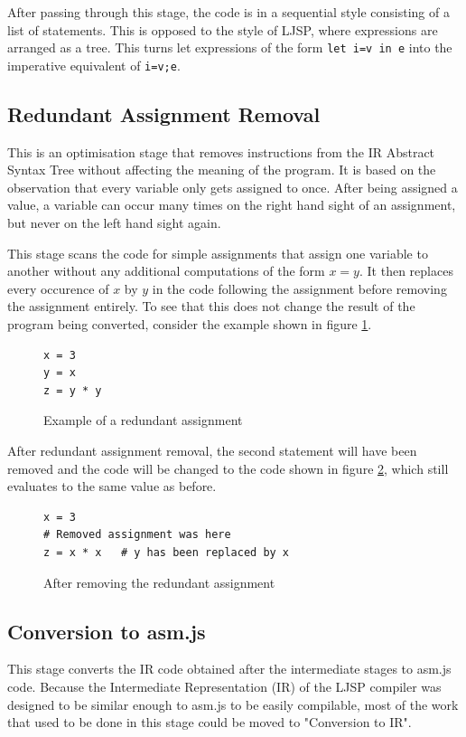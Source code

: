 \documentclass[11pt]{report}
\begin{document}
After passing through this stage, the code is in a sequential style consisting of a list of statements. This is opposed to the style of LJSP, where expressions are arranged as a tree. This turns let expressions of the form \texttt{let i=v in e} into the imperative equivalent of \texttt{i=v;e}.


\subsection{Redundant Assignment Removal}
This is an optimisation stage that removes instructions from the IR Abstract Syntax Tree without affecting the meaning of the program. It is based on the observation that every variable only gets assigned to once. After being assigned a value, a variable can occur many times on the right hand sight of an assignment, but never on the left hand sight again.

This stage scans the code for simple assignments that assign one variable to another without any additional computations of the form $x = y$. It then replaces every occurence of $x$ by $y$ in the code following the assignment before removing the assignment entirely. To see that this does not change the result of the program being converted, consider the example shown in figure \ref{redrem1}.
\begin{figure}[ht]
\begin{lstlisting}
x = 3
y = x
z = y * y
\end{lstlisting}
\caption{Example of a redundant assignment}
\label{redrem1}
\end{figure}

After redundant assignment removal, the second statement will have been removed and the code will be changed to the code shown in figure \ref{redrem2}, which still evaluates to the same value as before.
\begin{figure}[ht]
\begin{lstlisting}
x = 3
# Removed assignment was here
z = x * x   # y has been replaced by x
\end{lstlisting}
\caption{After removing the redundant assignment}
\label{redrem2}
\end{figure}


\subsection{Conversion to asm.js}
This stage converts the IR code obtained after the intermediate stages to asm.js code. Because the Intermediate Representation (IR) of the LJSP compiler was designed to be similar enough to asm.js to be easily compilable, most of the work that used to be done in this stage could be moved to "Conversion to IR".
\end{document}

